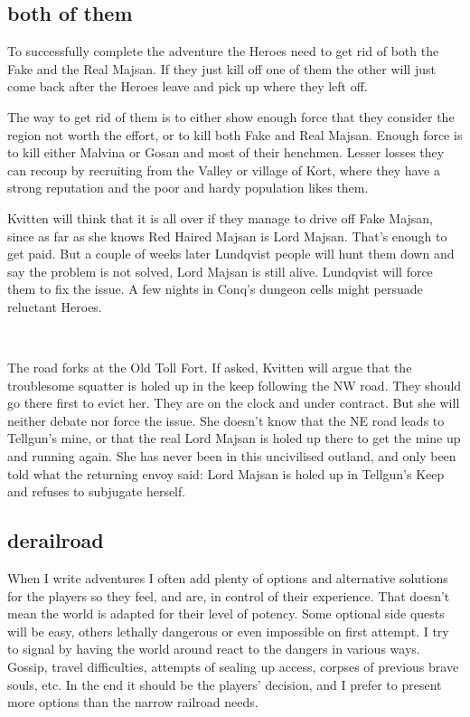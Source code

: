 \subsection*{both of them}
To successfully complete the adventure the Heroes need to get rid of both the Fake and the Real Majsan. If they just kill off one of them the other will just come back after the Heroes leave and pick up where they left off.

The way to get rid of them is to either show enough force that they consider the region not worth the effort, or to kill both Fake and Real Majsan. Enough force is to kill either Malvina or Gosan and most of their henchmen. Lesser losses they can recoup by recruiting from the Valley or village of Kort, where they have a strong reputation and the poor and hardy population likes them.

Kvitten will think that it is all over if they manage to drive off Fake Majsan, since as far as she knows Red Haired Majsan is Lord Majsan. That's enough to get paid. But a couple of weeks later Lundqvist people will hunt them down and say the problem is not solved, Lord Majsan is still alive. Lundqvist will force them to fix the issue. A few nights in Conq's dungeon cells might persuade reluctant Heroes.

\

The road forks at the Old Toll Fort. If asked, Kvitten will argue that the troublesome squatter is holed up in the keep following the NW road. They should go there first to evict her. They are on the clock and under contract. But she will neither debate nor force the issue. She doesn't know that the NE road leads to Tellgun's mine, or that the real Lord Majsan is holed up there to get the mine up and running again. She has never been in this uncivilised outland, and only been told what the returning envoy said: Lord Majsan is holed up in Tellgun's Keep and refuses to subjugate herself.


\subsection*{derailroad}
When I write adventures I often add plenty of options and alternative solutions for the players so they feel, and are, in control of their experience. That doesn't mean the world is adapted for their level of potency. Some optional side quests will be easy, others lethally dangerous or even impossible on first attempt. I try to signal by having the world around react to the dangers in various ways. Gossip, travel difficulties, attempts of sealing up access, corpses of previous brave souls, etc. In the end it should be the players' decision, and I prefer to present more options than the narrow railroad needs.

